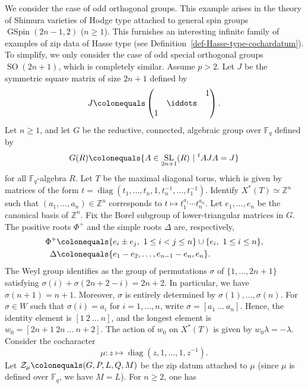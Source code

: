 \documentclass[11pt]{amsart}
\numberwithin{equation}{section}
\theoremstyle{definition}
\theoremstyle{remark}
\newcommand{\Zcal}{{\mathcal Z}}
\newcommand{\FF}{\mathbb{F}}
\newcommand{\ZZ}{\mathbb{Z}}
\DeclareMathOperator{\SL}{SL}
\DeclareMathOperator{\diag}{diag}
\DeclareMathOperator{\GSpin}{GSpin}
\DeclareMathOperator{\SO}{SO}
\begin{document}
We consider the case of odd orthogonal groups. This example arises in the theory of Shimura varieties of Hodge type attached to general spin groups $\GSpin(2n-1,2)$ ($n\geq 1$). This furnishes an interesting infinite family of examples of zip data of Hasse type (see Definition~\ref{def-Hasse-type-cochardatum}). To simplify, we only consider the case of odd special orthogonal groups $\SO(2n+1)$, which is completely similar. Assume $p>2$. Let $J$ be the symmetric square matrix of size $2n+1$ defined by
\begin{equation}
    J \colonequals \left(
    \begin{matrix}
    &&1 \\
    &\iddots& \\
    1&&
    \end{matrix}
    \right).
\end{equation}
Let $n\geq 1$, and let $G$ be the reductive, connected, algebraic group over $\FF_q$ defined by 
\begin{equation}
    G(R) \colonequals \{A\in \SL_{2n+1}(R) \ | \ {}^tA J A = J \}
\end{equation}
for all $\FF_q$-algebra $R$. Let $T$ be the maximal diagonal torus, which is given by matrices of the form $t=\diag(t_1, \dots ,t_n,1,t_n^{-1}, \dots ,t_1^{-1})$. Identify $X^*(T)\simeq \ZZ^n$ such that $(a_1, \dots ,a_n)\in \ZZ^n$ corresponds to $t\mapsto t_1^{a_1} \cdots t_n^{a_n}$. Let $e_1, \dots ,e_n$ be the canonical basis of $\ZZ^n$. Fix the Borel subgroup of lower-triangular matrices in $G$. The positive roots $\Phi^+$ and the simple roots $\Delta$ are, respectively, 
\begin{align}
    \Phi^+& \colonequals \{ e_i \pm e_j, \ 1\leq i< j \leq n\}\cup \{e_i, \ 1\leq i \leq n\},  \\
    \Delta & \colonequals \{e_1-e_2, \dots ,e_{n-1}-e_n,e_n\}.
\end{align}
The Weyl group identifies as the group of permutations $\sigma$ of $\{1, \dots ,2n+1\}$ satisfying $\sigma(i)+\sigma(2n+2-i)=2n+2$. In particular, we have $\sigma(n+1)=n+1$. Moreover, $\sigma$ is entirely determined by $\sigma(1), \dots ,\sigma(n)$. For $\sigma\in W$ such that $\sigma(i)=a_i$ for $i=1, \dots ,n$, write
$\sigma=[a_1 \  \dots  \ a_n]$. Hence, the identity element is $[1 \ 2 \ \dots  \ n]$, and the longest element is $w_0=[2n+1 \  2n\  \dots  \ n+2]$. The action of $w_0$ on $X^*(T)$ is given by $w_0\lambda =-\lambda$. Consider the cocharacter
\[\mu\colon z\longmapsto \diag(z,1, \dots ,1,z^{-1}).\]
Let $\Zcal_\mu\colonequals (G,P,L,Q,M)$ be the zip datum attached to $\mu$ (since $\mu$ is defined over $\FF_q$, we have $M=L$). For $n\geq 2$, one has 
\end{document}

